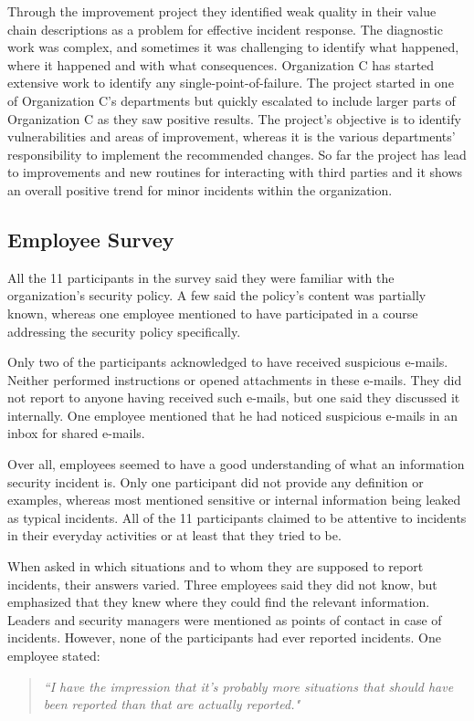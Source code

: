 Through the improvement project they identified weak quality in their value chain descriptions as a problem for effective incident response. The diagnostic work was complex, and sometimes it was challenging to identify what happened, where it happened and with what consequences. Organization C has started extensive work to identify any single-point-of-failure. The project started in one of Organization C's departments but quickly escalated to include larger parts of Organization C as they saw positive results. The project's objective is to identify vulnerabilities and areas of improvement, whereas it is the various departments' responsibility to implement the recommended changes. So far the project has lead to improvements and new routines for interacting with third parties and it shows an overall positive trend for minor incidents within the organization. 

\subsection{Employee Survey}
All the 11 participants in the survey said they were familiar with the organization's security policy. A few said the policy's content was partially known, whereas one employee mentioned to have participated in a course addressing the security policy specifically.

Only two of the participants acknowledged to have received suspicious e-mails. Neither performed instructions or opened attachments in these e-mails. They did not report to anyone having received such e-mails, but one said they discussed it internally. One employee mentioned that he had noticed suspicious e-mails in an inbox for shared e-mails. 

Over all, employees seemed to have a good understanding of what an information security incident is. Only one participant did not provide any definition or examples, whereas most mentioned sensitive or internal information being leaked as typical incidents. All of the 11 participants claimed to be attentive to incidents in their everyday activities or at least that they tried to be.

When asked in which situations and to whom they are supposed to report incidents, their answers varied. Three employees said they did not know, but emphasized that they knew where they could find the relevant information. Leaders and security managers were mentioned as points of contact in case of incidents. However, none of the participants had ever reported incidents. One employee stated: 
\begin{quote}
\textit{``I have the impression that it's probably more situations that should have been reported than that are actually reported."}
\end{quote}

